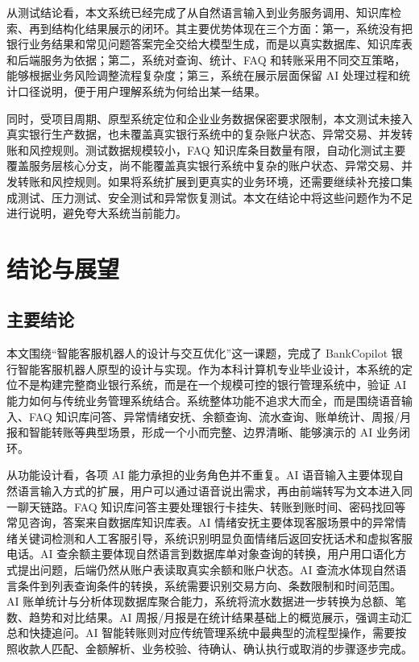 \documentclass[bachelor, print]{xduthesis}
\begin{document}
从测试结论看，本文系统已经完成了从自然语言输入到业务服务调用、知识库检索、再到结构化结果展示的闭环。其主要优势体现在三个方面：第一，系统没有把银行业务结果和常见问题答案完全交给大模型生成，而是以真实数据库、知识库表和后端服务为依据；第二，系统对查询、统计、FAQ 和转账采用不同交互策略，能够根据业务风险调整流程复杂度；第三，系统在展示层面保留 AI 处理过程和统计口径说明，便于用户理解系统为何给出某一结果。

同时，受项目周期、原型系统定位和企业业务数据保密要求限制，本文测试未接入真实银行生产数据，也未覆盖真实银行系统中的复杂账户状态、异常交易、并发转账和风控规则。测试数据规模较小，FAQ 知识库条目数量有限，自动化测试主要覆盖服务层核心分支，尚不能覆盖真实银行系统中复杂的账户状态、异常交易、并发转账和风控规则。如果将系统扩展到更真实的业务环境，还需要继续补充接口集成测试、压力测试、安全测试和异常恢复测试。本文在结论中将这些问题作为不足进行说明，避免夸大系统当前能力。

\chapter{结论与展望}

\section{主要结论}

本文围绕“智能客服机器人的设计与交互优化”这一课题，完成了 BankCopilot 银行智能客服机器人原型的设计与实现。作为本科计算机专业毕业设计，本系统的定位不是构建完整商业银行系统，而是在一个规模可控的银行管理系统中，验证 AI 能力如何与传统业务管理系统结合。系统整体功能不追求大而全，而是围绕语音输入、FAQ 知识库问答、异常情绪安抚、余额查询、流水查询、账单统计、周报/月报和智能转账等典型场景，形成一个小而完整、边界清晰、能够演示的 AI 业务闭环。

从功能设计看，各项 AI 能力承担的业务角色并不重复。AI 语音输入主要体现自然语言输入方式的扩展，用户可以通过语音说出需求，再由前端转写为文本进入同一聊天链路。FAQ 知识库问答主要处理银行卡挂失、转账到账时间、密码找回等常见咨询，答案来自数据库知识库表。AI 情绪安抚主要体现客服场景中的异常情绪关键词检测和人工客服引导，系统识别明显负面情绪后返回安抚话术和虚拟客服电话。AI 查余额主要体现自然语言到数据库单对象查询的转换，用户用口语化方式提出问题，后端仍然从账户表读取真实余额和账户状态。AI 查流水体现自然语言条件到列表查询条件的转换，系统需要识别交易方向、条数限制和时间范围。AI 账单统计与分析体现数据库聚合能力，系统将流水数据进一步转换为总额、笔数、趋势和对比结果。AI 周报/月报是在统计结果基础上的概览展示，强调主动汇总和快捷追问。AI 智能转账则对应传统管理系统中最典型的流程型操作，需要按照收款人匹配、金额解析、业务校验、待确认、确认执行或取消的步骤逐步完成。
\end{document}
